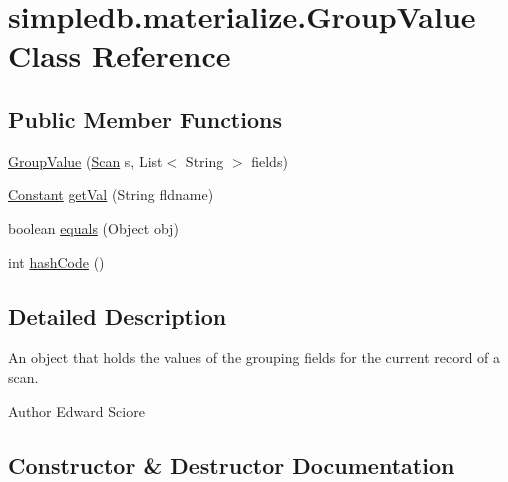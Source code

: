 \hypertarget{classsimpledb_1_1materialize_1_1GroupValue}{}\section{simpledb.\+materialize.\+Group\+Value Class Reference}
\label{classsimpledb_1_1materialize_1_1GroupValue}
\subsection*{Public Member Functions}
\begin{DoxyCompactItemize}
\item 
\hyperlink{classsimpledb_1_1materialize_1_1GroupValue_a6d65e14c563eb9d73d75da62528735af}{Group\+Value} (\hyperlink{interfacesimpledb_1_1query_1_1Scan}{Scan} s, List$<$ String $>$ fields)
\item 
\hyperlink{classsimpledb_1_1query_1_1Constant}{Constant} \hyperlink{classsimpledb_1_1materialize_1_1GroupValue_af53c8c966b982c0b62f6db2ec07fcbd0}{get\+Val} (String fldname)
\item 
boolean \hyperlink{classsimpledb_1_1materialize_1_1GroupValue_a5b0b30fc31eb67a79015bdc8b08340b0}{equals} (Object obj)
\item 
int \hyperlink{classsimpledb_1_1materialize_1_1GroupValue_a5a18a858cd82fe9c59399975447de206}{hash\+Code} ()
\end{DoxyCompactItemize}


\subsection{Detailed Description}
An object that holds the values of the grouping fields for the current record of a scan. \begin{DoxyAuthor}{Author}
Edward Sciore 
\end{DoxyAuthor}


\subsection{Constructor \& Destructor Documentation}
\mbox{\label{classsimpledb_1_1materialize_1_1GroupValue_a6d65e14c563eb9d73d75da62528735af}} 
